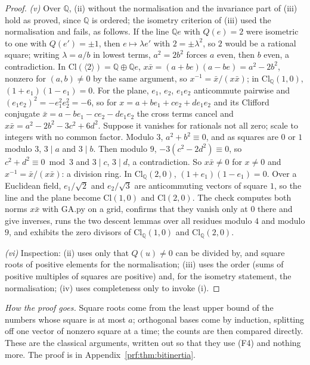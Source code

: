\documentclass[11pt]{article}
\theoremstyle{definition}
\theoremstyle{plain}
\providecommand{\Cl}{}\renewcommand{\Cl}{\mathrm{Cl}}
\providecommand{\Q}{}\renewcommand{\Q}{\mathbb{Q}}
\begin{document}
\begin{proof}
\emph{(v)} Over $\Q$, (ii) without the normalisation and the invariance part of (iii) hold as proved, since $\Q$ is ordered; the isometry criterion of (iii) used the normalisation and fails, as follows. If the line $\Q e$ with $Q(e) = 2$ were isometric to one with $Q(e') = \pm 1$, then $e \mapsto \lambda e'$ with $2 = \pm\lambda^{2}$, so $2$ would be a rational square; writing $\lambda = a/b$ in lowest terms, $a^{2} = 2b^{2}$ forces $a$ even, then $b$ even, a contradiction. In $\Cl(\langle 2 \rangle) = \Q \oplus \Q e$, $x\bar{x} = (a + be)(a - be) = a^{2} - 2b^{2}$, nonzero for $(a, b) \ne 0$ by the same argument, so $x^{-1} = \bar{x}/(x\bar{x})$; in $\Cl_{\Q}(1,0)$, $(1 + e_{1})(1 - e_{1}) = 0$. For the plane, $e_{1}$, $e_{2}$, $e_{1}e_{2}$ anticommute pairwise and $(e_{1}e_{2})^{2} = -e_{1}^{2}e_{2}^{2} = -6$, so for $x = a + be_{1} + ce_{2} + de_{1}e_{2}$ and its Clifford conjugate $\bar{x} = a - be_{1} - ce_{2} - de_{1}e_{2}$ the cross terms cancel and $x\bar{x} = a^{2} - 2b^{2} - 3c^{2} + 6d^{2}$. Suppose it vanishes for rationals not all zero; scale to integers with no common factor. Modulo $3$, $a^{2} + b^{2} \equiv 0$, and as squares are $0$ or $1$ modulo $3$, $3 \mid a$ and $3 \mid b$. Then modulo $9$, $-3(c^{2} - 2d^{2}) \equiv 0$, so $c^{2} + d^{2} \equiv 0 \bmod 3$ and $3 \mid c$, $3 \mid d$, a contradiction. So $x\bar{x} \ne 0$ for $x \ne 0$ and $x^{-1} = \bar{x}/(x\bar{x})$: a division ring. In $\Cl_{\Q}(2,0)$, $(1 + e_{1})(1 - e_{1}) = 0$. Over a Euclidean field, $e_{1}/\sqrt{2}$ and $e_{2}/\sqrt{3}$ are anticommuting vectors of square $1$, so the line and the plane become $\Cl(1,0)$ and $\Cl(2,0)$. The check computes both norms $x\bar{x}$ with GA.py on a grid, confirms that they vanish only at $0$ there and give inverses, runs the two descent lemmas over all residues modulo $4$ and modulo $9$, and exhibits the zero divisors of $\Cl_{\Q}(1,0)$ and $\Cl_{\Q}(2,0)$.

\emph{(vi)} Inspection: (ii) uses only that $Q(u) \ne 0$ can be divided by, and square roots of positive elements for the normalisation; (iii) uses the order (sums of positive multiples of squares are positive) and, for the isometry statement, the normalisation; (iv) uses completeness only to invoke (i).

\end{proof}

\label{c:note.geometry-first.setting-completion-number-systems-inside-2}
\noindent\emph{How the proof goes.} Square roots come from the least upper bound of the numbers whose square is at most $a$; orthogonal bases come by induction, splitting off one vector of nonzero square at a time; the counts are then compared directly. These are the classical arguments, written out so that they use (F4) and nothing more. The proof is in Appendix~\ref{prf:thm:bitinertia}.
\end{document}
